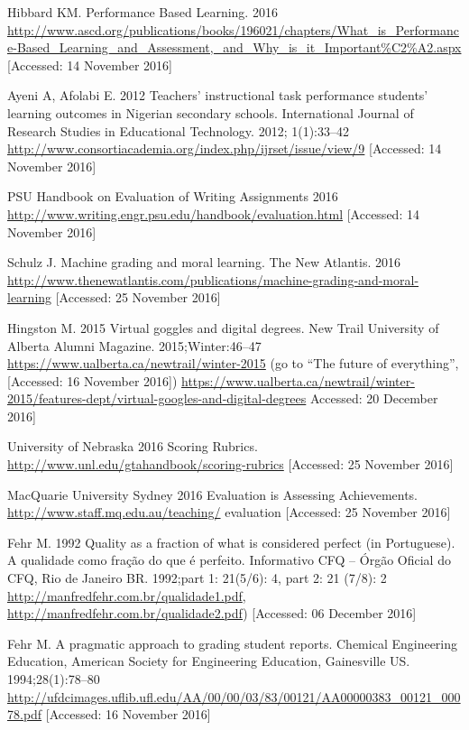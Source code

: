 \documentclass[numbers,sort&compress]{IntechOpen-Book}%
\begin{document}
\begin{backmatter}
\begin{thebibliography}{99}
Hibbard KM. Performance Based Learning. 2016 \url{http://www.ascd.org/publications/books/196021/chapters/What_is_Performance-Based_Learning_and_Assessment,_and_Why_is_it_Important\%C2\%A2.aspx} [Accessed: 14 November 2016]

Ayeni A, Afolabi E. 2012 Teachers' instructional task performance students' learning outcomes in Nigerian secondary schools. International Journal of Research Studies in Educational Technology. 2012; 1(1):33--42 \pagebreak \url{http://www.consortiacademia.org/index.php/ijrset/issue/view/9} [Accessed: 14 November 2016]

PSU Handbook on Evaluation of Writing Assignments 2016 \url{http://www.writing.engr.psu.edu/handbook/evaluation.html} [Accessed: 14 November 2016]

 Schulz J. Machine grading and moral
learning. The New Atlantis. 2016 \url{http://www.thenewatlantis.com/publications/machine-grading-and-moral-learning}
[Accessed: 25 November 2016]

 Hingston M. 2015 Virtual goggles
and digital degrees. New Trail
University of Alberta Alumni Magazine.
2015;Winter:46--47 \url{https://www.ualberta.ca/newtrail/winter-2015} (go to ``The
future of everything'', [Accessed: 16
November 2016]) \url{https://www.ualberta.ca/newtrail/winter-2015/features-dept/virtual-googles-and-digital-degrees}
Accessed: 20 December 2016]

 University of Nebraska 2016
Scoring Rubrics. \url{http://www.unl.edu/gtahandbook/scoring-rubrics} [Accessed:
25 November 2016]

 MacQuarie University Sydney 2016
Evaluation is Assessing Achievements.
\url{http://www.staff.mq.edu.au/teaching/}
evaluation [Accessed: 25 November 2016]

 Fehr M. 1992 Quality as a fraction
of what is considered perfect (in
Portuguese). A qualidade como fra\c{c}\~ao
do que \'e perfeito. Informativo CFQ --
\'Org\~ao Oficial do CFQ, Rio de Janeiro
BR. 1992;part 1: 21(5/6): 4, part 2: 21
(7/8): 2 \url{http://manfredfehr.com.br/qualidade1.pdf}, \url{http://manfredfehr.com.br/qualidade2.pdf}) [Accessed: 06
December 2016]

 Fehr M. A pragmatic approach
to grading student reports. Chemical
Engineering Education, American
Society for Engineering Education,
Gainesville US. 1994;28(1):78--80 \url{http://ufdcimages.uflib.ufl.edu/AA/00/00/03/83/00121/AA00000383_00121_00078.pdf}
[Accessed: 16 November 2016]


\end{thebibliography}
\end{backmatter}
\end{document}
